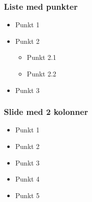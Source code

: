 \documentclass[t,24pt]{beamer}
\begin{document}
\begin{frame}[hvid]
    \frametitle{Liste med punkter}
    \begin{itemize}
        \item Punkt 1
        \item Punkt 2
              \begin{itemize}
                  \item Punkt 2.1
                  \item Punkt 2.2
              \end{itemize}
        \item Punkt 3
    \end{itemize}
\end{frame}

\begin{frame}[hvid]
    \frametitle{Slide med 2 kolonner}
    \begin{multicols}{2}
        \begin{itemize}
            \item Punkt 1
            \item Punkt 2
        \end{itemize}
        \vfill\null
        \columnbreak
        \begin{itemize}
            \item Punkt 3
            \item Punkt 4
            \item Punkt 5
        \end{itemize}
    \end{multicols}
\end{frame}
\end{document}
